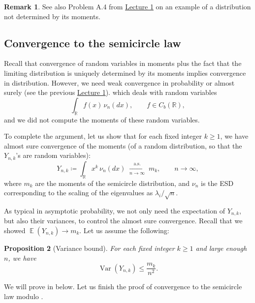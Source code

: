 \documentclass[letterpaper,11pt,oneside,reqno]{article}
\numberwithin{equation}{section}
\newtheorem{proposition}{Proposition}[section]
\theoremstyle{definition}
\newtheorem{remark}[proposition]{Remark}
\begin{document}
\begin{remark}
	See also Problem A.4 from \href{https://lpetrov.cc/rmt25/rmt25-notes/rmt2025-l01.pdf}{Lecture 1} on an example of a distribution not determined by its moments.
\end{remark}

\subsection{Convergence to the semicircle law}

Recall
\cite[Theorem~30.2]{billingsley1995probability}
that convergence
of random variables
in moments plus the fact that the
limiting distribution is uniquely determined by its moments
implies convergence in distribution.
However, we need weak convergence in probability or almost surely (see the
previous \href{https://lpetrov.cc/rmt25/rmt25-notes/rmt2025-l01.pdf}{Lecture 1}).
which deals with random variables
\begin{equation*}
\int_{\mathbb{R}} f(x) \, \nu_n(dx),\qquad f\in C_b(\mathbb{R}),
\end{equation*}
and we did not compute the moments of these random variables.

To complete the argument, let us show that for each fixed integer \(k\ge1\),
we have almost sure convergence of the moments (of a
random distribution, so that the $Y_{n,k}$'s are random variables):
\[
Y_{n,k}\coloneqq\int_{\mathbb{R}}x^k\,\nu_n(dx)
  \;\xrightarrow[n\to\infty]{\text{a.s.}}\;
	m_{k},
	\qquad n\to\infty,
\]
where $m_k$ are the moments of the semicircle distribution,
and $\nu_n$ is the ESD corresponding to the scaling of the
eigenvalues as $\lambda_i/\sqrt n$.

As typical in asymptotic probability, we not only need the
expectation of $Y_{n,k}$, but also their variances,
to control the almost sure convergence.
Recall that
we showed $\operatorname{\mathbb{E}}(Y_{n,k})\to m_k$.
Let us assume the following:
\begin{proposition}[Variance bound]
	\label{prop:variance-bound}
	For each fixed integer \(k\ge1\) and large enough \(n\),
	we have
	\begin{equation*}
	\operatorname{\mathrm{Var}}(Y_{n,k})\le \frac{m_k}{n^2}.
	\end{equation*}
\end{proposition}
We will prove  in 
below.
Let us finish the proof of convergence to the semicircle law modulo .
\end{document}
